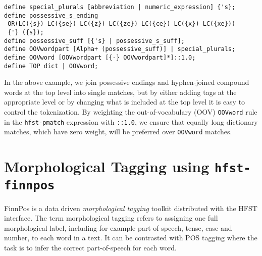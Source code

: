 \documentclass{llncs}
\begin{document}
\begin{center}
\begin{framed}
\begin{verbatim}
define special_plurals [abbreviation | numeric_expression] {'s};
define possessive_s_ending
 OR(LC({s}) LC({se}) LC({z}) LC({ze}) LC({ce}) LC({x}) LC({xe}))
 {'} ({s});
define possessive_suff [{'s} | possessive_s_suff];
define OOVwordpart [Alpha+ (possessive_suff)] | special_plurals;
define OOVword [OOVwordpart [{-} OOVwordpart]*]::1.0;
define TOP dict | OOVword;
\end{verbatim}
\end{framed}
\end{center}

\noindent In the above example, we join possessive endings and hyphen-joined compound words at the top
level into single matches, but by either adding tags at the appropriate level
or by changing what is included at the top level it is easy to control the
tokenization. By weighting the out-of-vocabulary (OOV) \verb+OOVword+ rule in the \verb+hfst-pmatch+ expression with \verb+::1.0+, 
we ensure that equally long dictionary matches, which have zero weight, will be preferred over \verb+OOVword+ matches.





\section{Morphological Tagging using {\tt hfst-finnpos}}\label{sec:morph-tagging}

FinnPos \cite{silfverberg/2015} is a data driven {\it morphological
  tagging} toolkit distributed with the HFST interface. The term
morphological tagging \cite{chrupala/2008} refers to assigning one
full morphological label, including for example part-of-speech, tense,
case and number, to each word in a text. It can be contrasted with
POS tagging where the task is to infer the correct part-of-speech for
each word.
\end{document}
